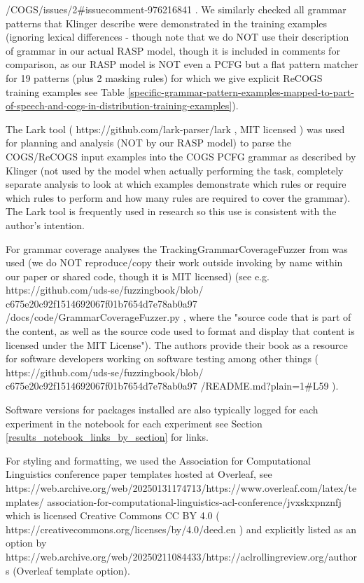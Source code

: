 \documentclass[11pt]{article}
\begin{document}
/COGS/issues/2\#issuecomment-976216841 .
We similarly checked all grammar patterns that Klinger describe were demonstrated in the training examples  (ignoring lexical differences - though note that we do NOT use their description of grammar in our actual RASP model, though it is included in comments for comparison, as our RASP model is NOT even a PCFG but a flat pattern matcher for 19 patterns (plus 2 masking rules) for which we give explicit ReCOGS training examples see Table \ref{specific-grammar-pattern-examples-mapped-to-part-of-speech-and-cogs-in-distribution-training-examples}). 

The Lark tool ( https://github.com/lark-parser/lark , MIT licensed ) was used for planning and analysis (NOT by our RASP model) to parse the COGS/ReCOGS input examples into the COGS PCFG grammar as described by Klinger (not used by the model when actually performing the task, completely separate analysis to look at which examples demonstrate which rules or require which rules to perform and how many rules are required to cover the grammar). The Lark tool is frequently used in research so this use is consistent with the author's intention.

For grammar coverage analyses the TrackingGrammarCoverageFuzzer from \cite{fuzzingbook2023:GrammarCoverageFuzzer} was used (we do NOT reproduce/copy their work outside invoking by name within our paper or shared code, though it is MIT licensed) (see e.g. https://github.com/uds-se/fuzzingbook/blob/
c675e20c92f1514692067f01b7654d7e78ab0a97
/docs/code/GrammarCoverageFuzzer.py , where the "source code that is part of the content, as well as the source code used to format and display that content is licensed under the MIT License"). The authors \cite{fuzzingbook2023:GrammarCoverageFuzzer} provide their book as a resource for software developers working on software testing among other things ( https://github.com/uds-se/fuzzingbook/blob/
c675e20c92f1514692067f01b7654d7e78ab0a97
/README.md?plain=1\#L59 ).

Software versions for packages installed are also typically logged for each experiment in the notebook for each experiment see Section \ref{results_notebook_links_by_section} for links.

For styling and formatting, we used the Association for Computational Linguistics conference paper templates hosted at Overleaf, see https://web.archive.org/web/20250131174713/https://www.overleaf.com/latex/templates/
association-for-computational-linguistics-acl-conference/jvxskxpnznfj which is licensed Creative Commons CC BY 4.0 ( https://creativecommons.org/licenses/by/4.0/deed.en ) and explicitly listed as an option by https://web.archive.org/web/20250211084433/https://aclrollingreview.org/authors (Overleaf template option).
\end{document}

